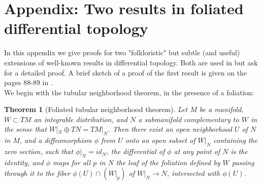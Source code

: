 \documentclass[a4paper,12pt,leqno]{article}
\newtheorem{thm}{Theorem}
\begin{document}


\appendix
\setcounter{secnumdepth}{0}
\section{Appendix: Two results in foliated differential topology}

In this appendix we give proofs for two "folkloristic" but subtle (and useful) extensions of well-known 
results in differential topology. Both are used in \cite{Martin1988} but ask for
a detailed proof. A brief sketch of a proof of the first result is given on the pages 88-89 in \cite{conl}. \\

We begin with the tubular neighborhood theorem, in the presence of a foliation:

\begin{thm}[Foliated tubular neighborhood theorem]
Let $M$ be a manifold, $W\subset TM$ an integrable distribution, and $N$ a submanifold complementary to $W$ in the sense that
 $W|_N\oplus TN = TM|_N$. Then there exist an open neighborhood $U$ of $N$ in $M$, and a diffeomorphism $\phi$ from $U$ 
 onto an open subset of $W|_N$ containing the zero section, such that $\phi|_N=id_N$, the differential of $\phi$ at any point of $N$ 
 is the identity, and $\phi$ maps for all $p$ in $N$ the leaf of the foliation defined by $W$ passing through it to the fiber 
 $\phi(U)\cap (W|_p)$ of $W\vert_N \to N$, intersected with $\phi(U)$. 
\end{thm}
\end{document}
